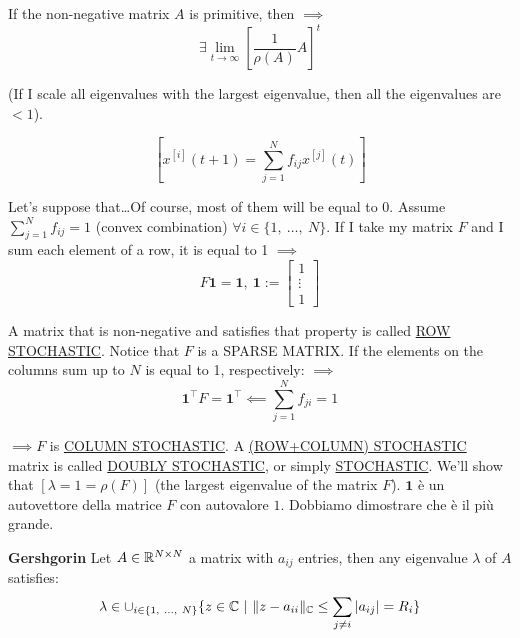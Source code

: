 \begin{corl}
If the non-negative matrix $A$ is primitive, then $\implies$
\[
	\exists \lim_{t\to\infty}{[\frac{1}{\rho(A)}A]^t}
\]

(If I scale all eigenvalues with the largest eigenvalue, then all the eigenvalues are $< 1$).
\end{corl}

\[
	[x^{[i]}(t+1) = \sum_{j=1}^N{f_{ij}x^{[j]}(t)}]
\]

Let's suppose that\dots Of course, most of them will be equal to 0. Assume $\sum_{j=1}^N{f_{ij}}=1$ (convex combination) $\forall i \in \{1,\ \dots,\ N\}$. If I take my matrix $F$ and I sum each element of a row, it is equal to 1 $\implies$
\[
	F\mathbf{1}=\mathbf{1},\ \mathbf{1} := \begin{bmatrix}1\\ \vdots\\ 1\end{bmatrix}
\]

A matrix that is non-negative and satisfies that property is called \underline{ROW STOCHASTIC}. Notice that $F$ is a SPARSE MATRIX. If the elements on the columns sum up to $N$ is equal to 1, respectively: $\implies$
\[	
	\mathbf{1}^\top F = \mathbf{1}^\top \impliedby \sum_{j=1}^Nf_{ji}=1
\]

$\implies F$ is \underline{COLUMN STOCHASTIC}. A \underline{(ROW+COLUMN) STOCHASTIC} matrix is called \underline{DOUBLY STOCHASTIC}, or simply \underline{STOCHASTIC}. We'll show that $[\lambda=1=\rho(F)]$ (the largest eigenvalue of the matrix $F$). $\mathbf{1}$ è un autovettore della matrice $F$ con autovalore $1$. Dobbiamo dimostrare che è il più grande.

\begin{thrm}{\textbf{Gershgorin}} \newline
\label{gershgorin}
Let $A \in \mathbb{R}^{N\times N}$ a matrix with $a_{ij}$ entries, then any eigenvalue $\lambda$ of $A$ satisfies:
\[
	\lambda \in \cup_{i\in\{1,\ \dots,\ N\}}{\{z \in \C\ |\ \norma{z-a_{ii}}_\C \leq \sum_{j\neq i}{\abs{a_{ij}}} = R_i\}}
\]
\end{thrm}


